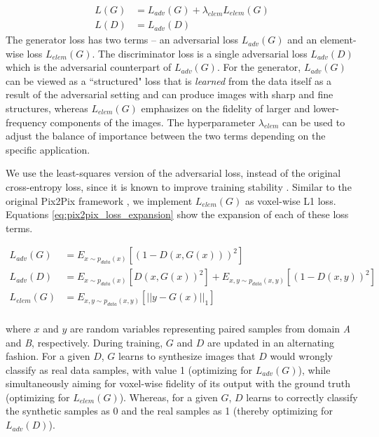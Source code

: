 \begin{equation}
    \begin{aligned}
    L(G) &= L_{adv}(G) + \lambda_{elem} L_{elem}(G) \\
    L(D) &= L_{adv}(D)
    \end{aligned}
    \label{eq:pix2pix_loss_components}
\end{equation}
The generator loss has two terms -- an adversarial loss $L_{adv}(G)$ and an element-wise loss $L_{elem}(G)$. The discriminator loss is a single adversarial loss $L_{adv}(D)$ which is the adversarial counterpart of $L_{adv}(G)$. For the generator, $L_{adv}(G)$ can be viewed as a ``structured" loss that is \textit{learned} from the data itself as a result of the adversarial setting and can produce images with sharp and fine structures, whereas $L_{elem}(G)$ emphasizes on the fidelity of larger and lower-frequency components of the images. The hyperparameter $\lambda_{elem}$ can be used to adjust the balance of importance between the two terms depending on the specific application.

We use the least-squares version of the adversarial loss, instead of the original cross-entropy loss, since it is known to improve training stability \cite{mao2017least}. Similar to the original Pix2Pix framework \cite{isola2017image}, we implement $L_{elem}(G)$ as voxel-wise L1 loss. Equations \ref{eq:pix2pix_loss_expansion} show the expansion of each of these loss terms.

\begin{equation}
    \begin{aligned}
    L_{adv}(G) &= E_{x \sim p_{data}(x)} [(1 - D(x, G(x)))^2]  \\
    L_{adv}(D) &= E_{x \sim p_{data}(x)} [D(x, G(x))^2] + E_{x,y \sim p_{data}(x,y)} [(1 - D(x,y))^2] \\
    L_{elem}(G) &= E_{x,y \sim p_{data}(x,y)} [|| y - G(x) ||_1]  \\
    \end{aligned}
    \label{eq:pix2pix_loss_expansion}
\end{equation}

where $x$ and $y$ are random variables representing paired samples from domain \textit{A} and \textit{B}, respectively. During training, $G$ and $D$ are updated in an alternating fashion. For a given $D$, $G$ learns to synthesize images that $D$ would wrongly classify as real data samples, with value 1 (optimizing for $L_{adv}(G)$), while simultaneously aiming for voxel-wise fidelity of its output with the ground truth (optimizing for $L_{elem}(G)$). Whereas, for a given $G$, $D$ learns to correctly classify the synthetic samples as 0 and the real samples as 1 (thereby optimizing for $L_{adv}(D)$).

